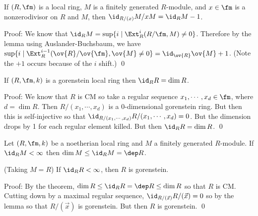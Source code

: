 \begin{cor}
If $(R,\fm)$ is a local ring, $M$ is a finitely generated $R$-module, and $x \in \fm$ is a nonzerodivisor on $R$ and $M$, then $\id_{R/(x)}M/xM=\id_R M-1$.
\end{cor}

\noindent Proof: We know that $\id_R M=\sup\{i \;|\; \Ext^i_R(R/\fm,M) \neq 0\}$. Therefore by the lemma using Auslander-Buchsbaum, we have $\sup\{i\;|\; \Ext_R^{i-1}(\ov{R}/\ov{\fm},\ov{M} \neq 0\}=\id_{\ov{R}} \ov{M}+1$. (Note the $+1$ occurs because of the $i$ shift.) \qed \\

\begin{cor}
If $(R,\fm,k)$ is a gorenstein local ring then $\id_R R=\dim R$.
\end{cor}

\noindent Proof: We know that $R$ is CM so take a regular sequence $x_1,\cdots,x_d \in \fm$, where $d=\dim R$. Then $R/(x_1,\cdots,x_d)$ is a 0-dimensional gorenstein ring. But then this is self-injective so that $\id_{R/(x_1,\cdots,x_d)} R/(x_1,\cdots,x_d)=0$. But the dimension drops by 1 for each regular element killed. But then $\id_R R=\dim R$. \qed \\

\begin{thmm}
Let $(R,\fm,k)$ be a noetherian local ring and $M$ a finitely generated $R$-module. If $\id_R M< \infty$ then $\dim M \leq \id_R M=\dep R$. 
\end{thmm}

\begin{cor}
(Taking $M=R$) If $\id_R R<\infty$, then $R$ is gorenstein. 
\end{cor}

\noindent Proof: By the theorem, $\dim R \leq \id_R R=\dep R \leq \dim R$ so that $R$ is CM. Cutting down by a maximal regular sequence, $\id_{R/(\vec{x})} R/(\vec{x})=0$ so by the lemma so that $R/(\vec{x})$ is gorenstein. But then $R$ is gorenstein. \qed \\